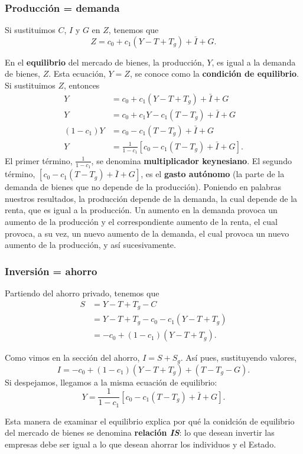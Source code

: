 \documentclass[10pt, landscape]{article}
\begin{document}
\begin{multicols*}{3}
\subsubsection{Producción = demanda}

Si sustituimos $C$, $I$ y $G$ en $Z$, tenemos que
\[ Z = c_0 + c_1(Y-T+T_g) + \bar{I} + G.  \]

En el \textbf{equilibrio} del mercado de bienes, la producción, $Y$, es igual a la demanda de bienes, $Z$. Esta ecuación, $Y=Z$, se conoce como la \textbf{condición de equilibrio}. Si sustituimos $Z$, entonces
\begin{align*}
    Y &= c_0 + c_1(Y-T+T_g) + \bar{I} + G \\
    Y &= c_0 + c_1Y - c_1(T-T_g) + \bar{I} + G \\
    (1-c_1)Y &= c_0 - c_1(T-T_g) + \bar{I} + G \\
    Y &= \frac{1}{1-c_1} \left[ c_0 - c_1(T-T_g) + \bar{I} + G \right].
\end{align*}
El primer término, $\frac{1}{1-c_1}$, se denomina \textbf{multiplicador keynesiano}. El segundo término, $\left[ c_0 - c_1(T-T_g) + \bar{I} + G \right]$, es el \textbf{gasto autónomo} (la parte de la demanda de bienes que no depende de la producción). Poniendo en palabras nuestros resultados, la producción depende de la demanda, la cual depende de la renta, que es igual a la producción. Un aumento en la demanda provoca un aumento de la producción y el correspondiente aumento de la renta, el cual provoca, a su vez, un nuevo aumento de la demanda, el cual provoca un nuevo aumento de la producción, y así sucesivamente.

\subsubsection{Inversión = ahorro}
Partiendo del ahorro privado, tenemos que
\begin{align*}
    S &= Y - T + T_g - C \\
      &= Y - T + T_g - c_0 - c_1(Y-T+T_g) \\
      &= -c_0 + (1 - c_1)(Y-T+T_g).      
\end{align*}

Como vimos en la sección del ahorro, $I = S + S_g$. Así pues, sustituyendo valores,
\[ I = -c_0 + (1 - c_1)(Y-T+T_g) + (T-T_g - G). \]
Si despejamos, llegamos a la misma ecuación de equilibrio:
\[ Y = \frac{1}{1-c_1} \left[ c_0 - c_1(T-T_g) + \bar{I} + G \right]. \]

Esta manera de examinar el equilibrio explica por qué la conidción de equilibrio del mercado de bienes se denomina \textbf{relación \textit{IS}}: lo que desean invertir las empresas debe ser igual a lo que desean ahorrar los individuos y el Estado.


\end{multicols*}
\end{document}
